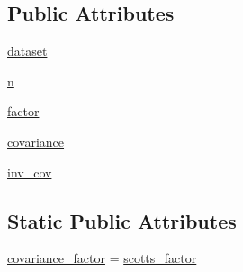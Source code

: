 \subsection*{Public Attributes}
\begin{DoxyCompactItemize}
\item 
\hyperlink{classscipy_1_1stats_1_1kde_1_1gaussian__kde_a9b885c9459c184a1c516a33b38444c16}{dataset}
\item 
\hyperlink{classscipy_1_1stats_1_1kde_1_1gaussian__kde_a1db123868b2181c0454880533ac00c60}{n}
\item 
\hyperlink{classscipy_1_1stats_1_1kde_1_1gaussian__kde_acee9260bd649ac101e5ccfbb5f180543}{factor}
\item 
\hyperlink{classscipy_1_1stats_1_1kde_1_1gaussian__kde_a735953115cddccf764caf021835bc0ca}{covariance}
\item 
\hyperlink{classscipy_1_1stats_1_1kde_1_1gaussian__kde_a92eef97e05fed104ccce6746ad07710c}{inv\+\_\+cov}
\end{DoxyCompactItemize}
\subsection*{Static Public Attributes}
\begin{DoxyCompactItemize}
\item 
\hyperlink{classscipy_1_1stats_1_1kde_1_1gaussian__kde_a919c68108e8515aa9d08d47df5268463}{covariance\+\_\+factor} = \hyperlink{classscipy_1_1stats_1_1kde_1_1gaussian__kde_a8ca0e79f1ef67e1c6d44b0be28b2a73b}{scotts\+\_\+factor}
\end{DoxyCompactItemize}


